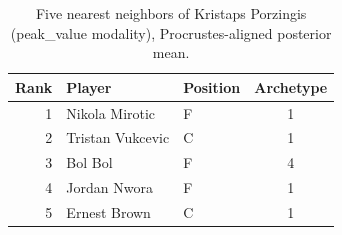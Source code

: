 \begin{table}[htbp]
  \centering\small
  \begin{tabular}{rllc}
    \toprule
    Rank & Player & Position & Archetype \\
    \midrule
    1 & Nikola Mirotic & F & 1 \\
    2 & Tristan Vukcevic & C & 1 \\
    3 & Bol Bol & F & 4 \\
    4 & Jordan Nwora & F & 1 \\
    5 & Ernest Brown & C & 1 \\
    \bottomrule
  \end{tabular}
  \caption{Five nearest neighbors of Kristaps Porzingis (peak_value modality), Procrustes-aligned posterior mean.}
  \label{tab:Kristaps_Porzingis_neighbors_peak_value}
\end{table}


